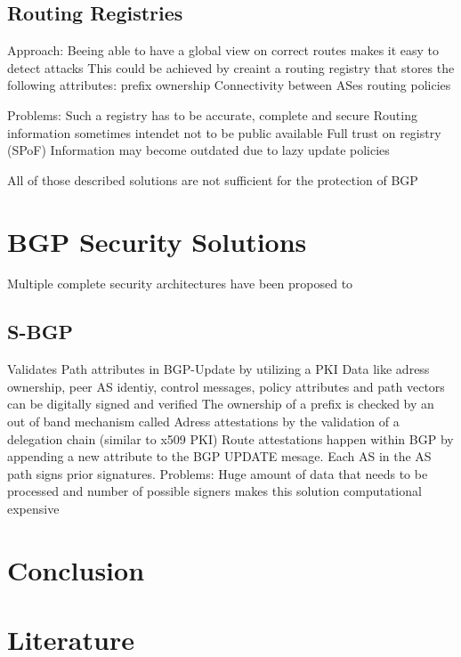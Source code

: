 \documentclass[12pt]{IEEEtran}
\begin{document}
       \subsection{Routing Registries}
		Approach: Beeing able to have a global view on correct routes makes it easy to detect attacks
		This could be achieved by creaint a routing registry that stores the following attributes:
			prefix ownership
			Connectivity between ASes
			routing policies
			
		Problems: 
			Such a registry has to be accurate, complete and secure
			Routing information sometimes intendet not to be public available
			Full trust on registry (SPoF)
			Information may become outdated due to lazy update policies
       		
       
       
       		
       			
	All of those described solutions are not sufficient for the protection of BGP

       \section{BGP Security Solutions}

       Multiple complete security architectures have been proposed to 
       \subsection{S-BGP}
			Validates Path attributes in BGP-Update by utilizing a PKI
			Data like adress ownership, peer AS identiy, control messages, policy attributes and path vectors can be digitally signed and verified
			The ownership of a prefix is checked by an out of band mechanism called Adress attestations by the validation of a delegation chain (similar to x509 PKI)
			Route attestations happen within BGP by appending a new attribute to the BGP UPDATE mesage. Each AS in the AS path signs prior signatures.
			Problems: 
				Huge amount of data that needs to be processed and number of possible signers makes this solution computational expensive
				
	\section{Conclusion}				

	
	\section{Literature}
\end{document}
